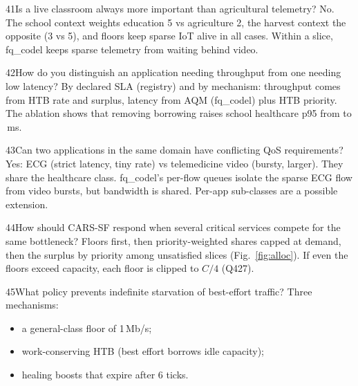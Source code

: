 \begin{qa}{41}{Is a live classroom always more important than agricultural telemetry?}
No. The school context weights education 5 vs agriculture 2, the harvest context the opposite (3 vs 5), and floors
keep sparse IoT alive in all cases. Within a slice, fq\_codel keeps sparse telemetry from waiting behind video.
\end{qa}

\begin{qa}{42}{How do you distinguish an application needing throughput from one needing low latency?}
By declared SLA (registry) and by mechanism: throughput comes from HTB rate and surplus, latency from AQM (fq\_codel)
plus HTB priority. The ablation shows that removing borrowing raises school healthcare p95 from
\NAblSchoolFullHc{} to \NAblSchoolFullStrictHc\,ms.
\end{qa}

\begin{qa}{43}{Can two applications in the same domain have conflicting QoS requirements?}
Yes: ECG (strict latency, tiny rate) vs telemedicine video (bursty, larger). They share the healthcare class.
fq\_codel's per-flow queues isolate the sparse ECG flow from video bursts, but bandwidth is shared.
Per-app sub-classes are a possible extension.
\end{qa}

\begin{qa}{44}{How should CARS-SF respond when several critical services compete for the same bottleneck?}
Floors first, then priority-weighted shares capped at demand, then the surplus by priority among unsatisfied slices
(Fig.~\ref{fig:alloc}). If even the floors exceed capacity, each floor is clipped to $C/4$ (Q427).
\end{qa}

\begin{qa}{45}{What policy prevents indefinite starvation of best-effort traffic?}
Three mechanisms:
\begin{itemize}
\item a general-class floor of 1\,Mb/s;
\item work-conserving HTB (best effort borrows idle capacity);
\item healing boosts that expire after 6 ticks.
\end{itemize}
\end{qa}

